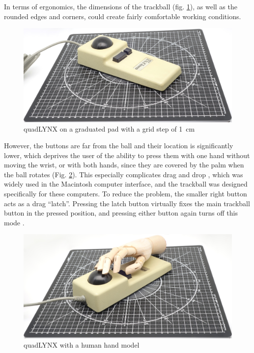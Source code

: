 \documentclass[11pt, a4paper]{article}
\begin{document}
In terms of ergonomics, the dimensions of the trackball (fig. \ref{fig:quadLYNXSize}), as well as the rounded edges and corners, could create fairly comfortable working conditions.

\begin{figure}[h]
    \centering
    \includegraphics[scale=0.4]{1986_honeywell_asher_quadlynx_trackball/size_30.jpg}
    \caption{quadLYNX on a graduated pad with a grid step of 1~cm}
    \label{fig:quadLYNXSize}
\end{figure}

However, the buttons are far from the ball and their location is significantly lower, which deprives the user of the ability to press them with one hand without moving the wrist, or with both hands, since they are covered by the palm when the ball rotates (Fig. \ref{fig:quadLYNXHand}). This especially complicates drag and drop , which was widely used in the Macintosh computer interface, and the trackball was designed specifically for these computers. To reduce the problem, the smaller right button acts as a drag ``latch''. Pressing the latch button virtually fixes the main trackball button in the pressed position, and pressing either button again turns off this mode \cite{bible}.

\begin{figure}[h]
    \centering
    \includegraphics[scale=0.4]{1986_honeywell_asher_quadlynx_trackball/hand_30.jpg}
    \caption{quadLYNX with a human hand model}
    \label{fig:quadLYNXHand}
\end{figure}
\end{document}
